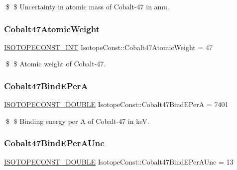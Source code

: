 \$ \$ Uncertainty in atomic mass of Cobalt-\/47 in amu. \mbox{\label{group___isotope_const-_cobalt-_co47_ga0cd20710c3cc124bdc234155502d5517}} 
\subsubsection{\texorpdfstring{Cobalt47\+Atomic\+Weight}{Cobalt47AtomicWeight}}
{\footnotesize\ttfamily \mbox{\hyperlink{group___isotope_const-_macros_ga5f18360b3e99483a35c32d789e62621c}{I\+S\+O\+T\+O\+P\+E\+C\+O\+N\+S\+T\+\_\+\+I\+NT}} Isotope\+Const\+::\+Cobalt47\+Atomic\+Weight = 47}

\$ \$ Atomic weight of Cobalt-\/47. \mbox{\label{group___isotope_const-_cobalt-_co47_gaf432045e546472ff57eb8df8d2241fea}} 
\subsubsection{\texorpdfstring{Cobalt47\+Bind\+E\+PerA}{Cobalt47BindEPerA}}
{\footnotesize\ttfamily \mbox{\hyperlink{group___isotope_const-_macros_ga8f45a7272ce02c0b4c65c44636ed719a}{I\+S\+O\+T\+O\+P\+E\+C\+O\+N\+S\+T\+\_\+\+D\+O\+U\+B\+LE}} Isotope\+Const\+::\+Cobalt47\+Bind\+E\+PerA = 7401}

\$ \$ Binding energy per A of Cobalt-\/47 in keV. \mbox{\label{group___isotope_const-_cobalt-_co47_ga8c2175c84b347ced59d1a86c130ad3e4}} 
\subsubsection{\texorpdfstring{Cobalt47\+Bind\+E\+Per\+A\+Unc}{Cobalt47BindEPerAUnc}}
{\footnotesize\ttfamily \mbox{\hyperlink{group___isotope_const-_macros_ga8f45a7272ce02c0b4c65c44636ed719a}{I\+S\+O\+T\+O\+P\+E\+C\+O\+N\+S\+T\+\_\+\+D\+O\+U\+B\+LE}} Isotope\+Const\+::\+Cobalt47\+Bind\+E\+Per\+A\+Unc = 13}

